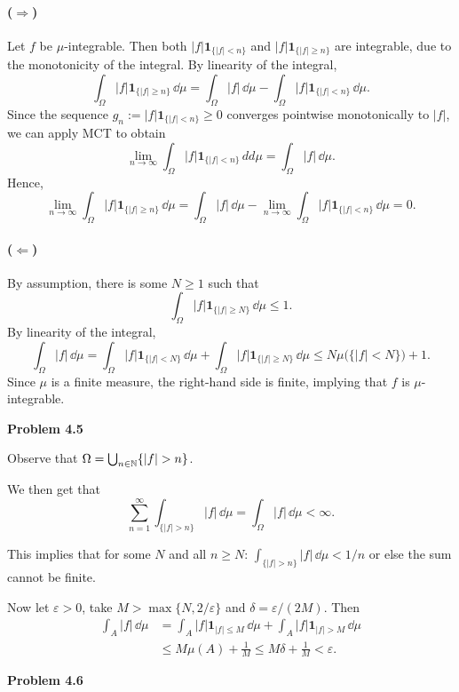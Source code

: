 \paragraph{($\Rightarrow$)} Let $f$ be $\mu$-integrable. Then both $|f|\mathbf{1}_{\{|f|<n\}}$ and $|f|\mathbf{1}_{\{|f|\ge n\}}$ are integrable, due to the monotonicity of the integral. By linearity of the integral,
\[
	\int_\Omega |f|\mathbf{1}_{\{|f|\ge n\}}\,\dd\mu = \int_\Omega |f|\,\dd\mu - \int_\Omega |f|\mathbf{1}_{\{|f|< n\}}\,\dd\mu.
\]
Since the sequence $g_n:= |f|\mathbf{1}_{\{|f|< n\}}\ge 0$ converges pointwise monotonically to $|f|$, we can apply MCT to obtain
\[
	\lim_{n\to\infty} \int_\Omega |f|\mathbf{1}_{\{|f|< n\}}\,dd\mu = \int_\Omega |f|\,\dd\mu.
\]
Hence,
\[	
	\lim_{n\to\infty}\int_\Omega |f|\mathbf{1}_{\{|f|\ge n\}}\,\dd\mu = \int_\Omega |f|\,\dd\mu - \lim_{n\to\infty}\int_\Omega |f|\mathbf{1}_{\{|f|< n\}}\,\dd\mu = 0.
\]

\paragraph{($\Leftarrow$)} By assumption, there is some $N\ge 1$ such that
\[
	\int_\Omega |f|\mathbf{1}_{\{|f|\ge N\}}\,\dd\mu \le 1.
\]
By linearity of the integral,
\[
	\int_\Omega |f|\,\dd\mu = \int_\Omega |f|\mathbf{1}_{\{|f|< N\}}\,\dd\mu +\int_\Omega |f|\mathbf{1}_{\{|f|\ge N\}}\,\dd\mu \le N \mu\bigl(\{|f|< N\}\bigr) + 1.
\]
Since $\mu$ is a finite measure, the right-hand side is finite, implying that $f$ is $\mu$-integrable.

\bigskip
\textbf{Problem 4.5}

Observe that $\Omega = \bigcup_{n \in \mathbb N} \{|f| > n\}$. 

We then get that
\[
	\sum_{n = 1}^\infty \int_{\{|f| > n\}} |f| \, \dd \mu = \int_\Omega |f| \, \dd \mu < \infty.
\]

This implies that for some $N$ and all $n \ge N$: $\int_{\{|f| > n\}} |f| \, \dd \mu < 1/n$ or else the sum cannot be finite.

Now let $\varepsilon > 0$, take $M > \max\{N, 2/\varepsilon\}$ and $\delta = \varepsilon/(2M)$. Then
\begin{align*}
	\int_A |f| \, \dd \mu &= \int_A |f| \mathbf{1}_{|f|\le M} \, \dd \mu + \int_A |f| \mathbf{1}_{|f|> M} \, \dd \mu\\
	&\le M \mu(A) + \frac{1}{M} \le M\delta + \frac{1}{M} < \varepsilon.
\end{align*}

\bigskip
\textbf{Problem 4.6}

